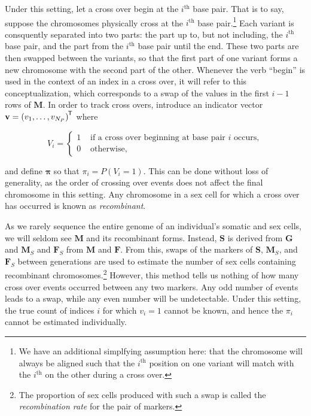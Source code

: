 \documentclass{article}
\newcommand{\ve}[1]{\mathbf{#1}}           %
\newcommand{\sv}[1]{\boldsymbol{#1}}   %
\newcommand{\m}[1]{\mathbf{#1}}               %
\newcommand{\tr}[1]{{#1}^{\mkern-1.5mu\mathsf{T}}}              %
\begin{document}
Under this setting, let a cross over begin at the $i^{\text{th}}$ base pair. That is to say, suppose the chromosomes physically cross at the $i^{\text{th}}$ base pair.\footnote{We have an additional simplfying assumption here: that the chromosome will always be aligned such that the $i^{\text{th}}$ position on one variant will match with the $i^{\text{th}}$ on the other during a cross over.} Each variant is consquently separated into two parts: the part up to, but not including, the $i^{\text{th}}$ base pair, and the part from the $i^{\text{th}}$ base pair until the end. These two parts are then swapped between the variants, so that the first part of one variant forms a new chromosome with the second part of the other. Whenever the verb ``begin'' is used in the context of an index in a cross over, it will refer to this conceptualization, which corresponds to a swap of the values in the first $i-1$ rows of $\m{M}$. In order to track cross overs, introduce an indicator vector $\ve{v} = \tr{(v_1, \dots, v_{N_P})}$ where

\begin{equation} \label{eq:crossindicator}
V_i = \begin{cases}
  1 & \text{ if a cross over beginning at base pair } i \text{ occurs}, \\
  0 & \text{ otherwise},
\end{cases}
\end{equation}

\noindent and define $\sv{\pi}$ so that $\pi_i = P(V_i = 1)$. This can be done without loss of generality, as the order of crossing over events does not affect the final chromosome in this setting. Any chromosome in a sex cell for which a cross over has occurred is known as \textit{recombinant}.

As we rarely sequence the entire genome of an individual's somatic and sex cells, we will seldom see $\m{M}$ and its recombinant forms. Instead, $\m{S}$ is derived from $\m{G}$ and $\m{M}_S$ and $\m{F}_S$ from $\m{M}$ and $\m{F}$. From this, swaps of the markers of $\m{S}$, $\m{M}_S$, and $\m{F}_S$ between generations are used to estimate the number of sex cells containing recombinant chromosomes.\footnote{The proportion of sex cells produced with such a swap is called the \textit{recombination rate} for the pair of markers.} However, this method tells us nothing of how many cross over events occurred between any two markers. Any odd number of events leads to a swap, while any even number will be undetectable. Under this setting, the true count of indices $i$ for which $v_i = 1$ cannot be known, and hence the $\pi_i$ cannot be estimated individually.
\end{document}
